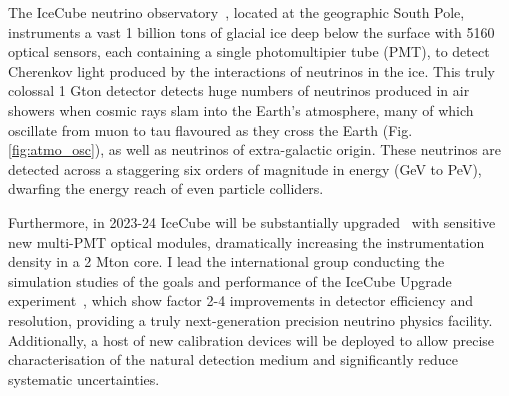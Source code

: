 \documentclass[a4paper,11pt]{article}
\begin{document}
The IceCube neutrino observatory~\cite{Aartsen_2017}, located at the geographic South Pole, instruments a vast 1 billion tons of glacial ice deep below the surface with 5160 optical sensors, each containing a single photomultipier tube (PMT), to detect Cherenkov light produced by the interactions of neutrinos in the ice. This truly colossal 1 Gton detector detects huge numbers of neutrinos produced in air showers when cosmic rays slam into the Earth's atmosphere, many of which oscillate from muon to tau flavoured as they cross the Earth (Fig. \ref{fig:atmo_osc}), as well as neutrinos of extra-galactic origin. These neutrinos are detected across a staggering six orders of magnitude in energy (GeV to PeV), dwarfing the energy reach of even particle colliders. 




Furthermore, in 2023-24 IceCube will be substantially upgraded~\cite{IceCubeUpgrade_ICRC2019} with sensitive new multi-PMT optical modules, dramatically increasing the instrumentation density in a 2 Mton core. I lead the international group conducting the simulation studies of the goals and performance of the IceCube Upgrade experiment~\cite{IceCubeUpgrade_ICRC2019, NuFactProceedings}, which show factor 2-4 improvements in detector efficiency and resolution, providing a truly next-generation precision neutrino physics facility. Additionally, a host of new calibration devices will be deployed to allow precise characterisation of the natural detection medium and significantly reduce systematic uncertainties.\\



\end{document}
